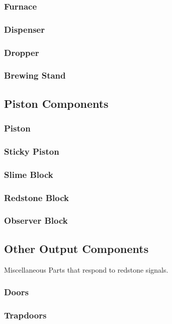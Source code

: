 \documentclass[12pt]{article}
\begin{document}
\subsubsection{Furnace}
\subsubsection{Dispenser}
\subsubsection{Dropper}
\subsubsection{Brewing Stand}

\pagebreak

\subsection{Piston Components}
\subsubsection{Piston}
\subsubsection{Sticky Piston}
\subsubsection{Slime Block}
\subsubsection{Redstone Block}
\subsubsection{Observer Block}

\pagebreak

\subsection{Other Output Components}
Miscellaneous Parts that respond to redstone signals.
\subsubsection{Doors}
\subsubsection{Trapdoors}
\end{document}
